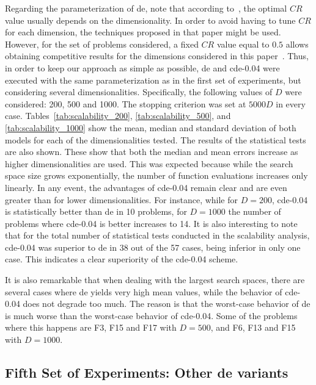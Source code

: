 \documentclass[review,3p]{elsarticle}
\newcommand{\CDE}{c{\sc de}}
\newcommand{\DE}{{\sc de}}
\begin{document}
Regarding the parameterization of \DE{}, note that according to~\cite{Zhao:13}, the optimal $CR$ value usually depends on the dimensionality.
%
In order to avoid having to tune $CR$ for each dimension, the techniques proposed in that paper might be used.
%
However, for the set of problems considered, a fixed $CR$ value equal to $0.5$ allows obtaining competitive results
for the dimensions considered in this paper~\cite{LaTorre:11}.
%
Thus, in order to keep our approach as simple as possible,
\DE{} and \CDE{}-0.04 were executed with
the same parameterization as in the first set of experiments,
but considering several dimensionalities.
%
Specifically, the following values of $D$ were considered: 200, 500 and 1000.
%
The stopping criterion was set at $5000D$ in every case.
%
Tables~\ref{tab:scalability_200}, \ref{tab:scalability_500},
and \ref{tab:scalability_1000} show the mean, median and standard deviation
of both models for each of the dimensionalities tested.
%
The results of the statistical tests are also shown.
%
These show that both the median and mean errors increase as higher dimensionalities are used.
%
This was expected because while the search space size grows exponentially, the number of function evaluations increases only linearly.
%
In any event, the advantages of \CDE{}-0.04 remain clear and are even greater than for lower dimensionalities.
%
For instance, while for $D = 200$, \CDE{}-0.04 is statistically better than \DE{} in
10 problems, for $D = 1000$ the number of problems where \CDE{}-0.04 is better increases to 14.
%
It is also interesting to note that for the total number of statistical tests conducted in
the scalability analysis, \CDE{}-0.04 was superior to \DE{} in 38 out of the 57 cases, being inferior in only one case.
%
This indicates a clear superiority of the \CDE{}-0.04 scheme.

It is also remarkable that when dealing with the largest search spaces,
there are several cases where \DE{} yields very high mean values, while the behavior of
\CDE{}-0.04 does not degrade too much.
%
The reason is that the worst-case behavior of \DE{} is much worse than the worst-case behavior of \CDE{}-0.04.
%
Some of the problems where this happens are F3, F15 and F17 with $D = 500$, and F6, F13 and F15 with $D = 1000$.

\subsection{Fifth Set of Experiments: Other \DE{} variants}
\end{document}
